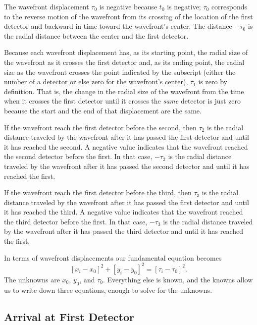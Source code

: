 \documentclass[twocolumn]{article}
\begin{document}
The wavefront displacement $\tau_0$ is negative because $t_0$ is negative;
$\tau_0$ corresponds to the reverse motion of the wavefront from its crossing
of the location of the first detector and backward in time toward the
wavefront's center.  The distance $-\tau_0$ is the radial distance between the
center and the first detector.

Because each wavefront displacement has, as its starting point, the radial size
of the wavefront as it crosses the first detector and, as its ending point, the
radial size as the wavefront crosses the point indicated by the subscript
(either the number of a detector or else zero for the wavefront's center),
$\tau_1$ is zero by definition.  That is, the change in the radial size of the
wavefront from the time when it crosses the first detector until it crosses the
\emph{same} detector is just zero because the start and the end of that
displacement are the same.

If the wavefront reach the first detector before the second, then $\tau_2$ is
the radial distance traveled by the wavefront after it has passed the first
detector and until it has reached the second.  A negative value indicates that
the wavefront reached the second detector before the first.  In that case,
$-\tau_2$ is the radial distance traveled by the wavefront after it has passed
the second detector and until it has reached the first.

If the wavefront reach the first detector before the third, then $\tau_3$ is
the radial distance traveled by the wavefront after it has passed the first
detector and until it has reached the third.  A negative value indicates that
the wavefront reached the third detector before the first.  In that case,
$-\tau_3$ is the radial distance traveled by the wavefront after it has passed
the third detector and until it has reached the first.

In terms of wavefront displacements our fundamental equation becomes
\begin{equation}
   \left[x_i - x_0\right]^2 + \left[y_i - y_0\right]^2 = \left[\tau_i -
   \tau_0\right]^2.
\end{equation}
The unknowns are $x_0$, $y_0$, and $\tau_0$. Everything else is known, and the
knowns allow us to write down three equations, enough to solve for the
unknowns.

\subsection{Arrival at First Detector}
\end{document}
